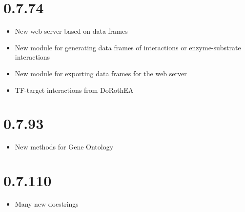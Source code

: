 \documentclass[letterpaper,10pt,english]{sphinxmanual}
\begin{document}
\section{0.7.74}
\label{\detokenize{index:id11}}\begin{itemize}
\item {} 
New web server based on  data frames

\item {} 
New module  for generating data frames of interactions or enzyme-substrate interactions

\item {} 
New module  for exporting data frames for the web server

\item {} 
TF-target interactions from DoRothEA

\end{itemize}


\section{0.7.93}
\label{\detokenize{index:id12}}\begin{itemize}
\item {} 
New  methods for Gene Ontology

\end{itemize}


\section{0.7.110}
\label{\detokenize{index:id13}}\begin{itemize}
\item {} 
Many new docstrings

\end{itemize}
\end{document}
